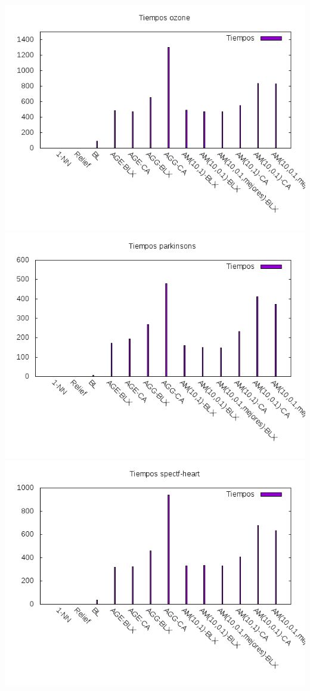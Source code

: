 \documentclass[12pt,a4paper]{article}
\begin{document}
	\includegraphics[scale=0.5]{../Graficas/Imagenes/Tiempos/tiempos_ozone.png}
	\includegraphics[scale=0.5]{../Graficas/Imagenes/Tiempos/tiempos_parkinsons.png}
	\includegraphics[scale=0.5]{../Graficas/Imagenes/Tiempos/tiempos_spectf-heart.png}
	
\end{document}
